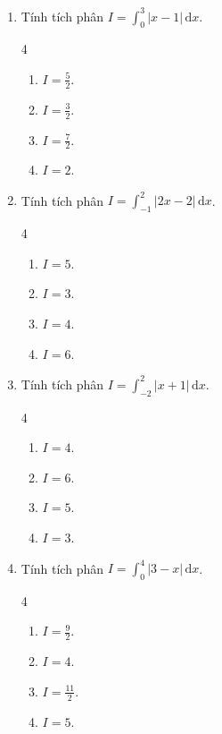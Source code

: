\documentclass[12pt]{article}
\begin{document}
\begin{enumerate}[label=\textbf{Câu \arabic*.}]
		\item Tính tích phân $I = \displaystyle \int_{0}^{3} |x - 1|\,\mathrm{d}x$.
		\begin{multicols}{4}
			\begin{enumerate}[label=\textbf{\Alph*.}]
				\item $I = \frac{5}{2}$.
				\item $I = \frac{3}{2}$.
				\item $I = \frac{7}{2}$.
				\item $I = 2$.
			\end{enumerate}
		\end{multicols}
		
		\item Tính tích phân $I = \displaystyle \int_{-1}^{2} |2x - 2|\,\mathrm{d}x$.
		\begin{multicols}{4}
			\begin{enumerate}[label=\textbf{\Alph*.}]
				\item $I = 5$.
				\item $I = 3$.
				\item $I = 4$.
				\item $I = 6$.
			\end{enumerate}
		\end{multicols}
		
		\item Tính tích phân $I = \displaystyle \int_{-2}^{2} |x + 1|\,\mathrm{d}x$.
		\begin{multicols}{4}
			\begin{enumerate}[label=\textbf{\Alph*.}]
				\item $I = 4$.
				\item $I = 6$.
				\item $I = 5$.
				\item $I = 3$.
			\end{enumerate}
		\end{multicols}
		
		\item Tính tích phân $I = \displaystyle \int_{0}^{4} |3 - x|\,\mathrm{d}x$.
		\begin{multicols}{4}
			\begin{enumerate}[label=\textbf{\Alph*.}]
				\item $I = \frac{9}{2}$.
				\item $I = 4$.
				\item $I = \frac{11}{2}$.
				\item $I = 5$.
			\end{enumerate}
		\end{multicols}
		

\end{enumerate}
\end{document}
